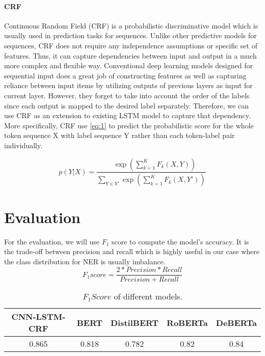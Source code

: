 \documentclass[conference]{IEEEtran}
\begin{document}
\paragraph{CRF} Continuous Random Field (CRF) is a probabilistic discriminative model
which is usually used in prediction tasks for sequences. Unlike other predictive models
for sequences, CRF does not require any independence assumptions or specific set of
features. Thus, it can capture dependencies between input and output in a much more
complex and flexible way. Conventional deep learning models designed for sequential
input does a great job of constructing features as well as capturing reliance between
input items by utilizing outputs of previous layers as input for current layer.
However, they forget to take into account the order of the labels since each output is
mapped to the desired label separately. Therefore, we can use CRF as an extension to
existing LSTM model to capture that dependency. More specifically, CRF use \ref{eq:1}
to predict the probabilistic score for the whole token sequence X with label sequence Y
rather than each token-label pair individually.

\begin{equation}
p(Y|X) = \frac{\quad \exp(\sum\limits_{k=1}^{K} F_k(X,Y))} {\sum\limits_{Y \in Y'} \exp(\sum\limits_{k=1}^{K} F_k(X,Y'))}
\label{eq:1}
\end{equation}

\vspace{4mm}
\section{Evaluation} \label{section5}
For the evaluation, we will use $F_1$ score to compute the model's accuracy. It is the
trade-off between precision and recall which is highly useful in our case where the
class distribution for NER is usually imbalance.
\begin{equation}
F_1 score = \frac{2 * Precision * Recall}{Precision + Recall}
\label{eq:2}
\end{equation}

\begin{table}[h!]
\centering
\caption{$F_1 Score$ of different models.}
\begin{tabular}{|c|c|c|c|c|}
\hline
CNN-LSTM-CRF & BERT & DistilBERT & RoBERTa & DeBERTa \\
\hline
0.865 & 0.818 & 0.782 & 0.82 & 0.84 \\
\hline
\end{tabular}
\label{table1}
\end{table}
\end{document}
